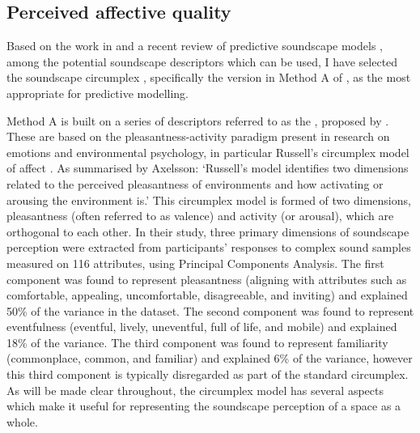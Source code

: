 
\subsection{Perceived affective quality}
\label{sec:paqReview}
Based on the work in \citet{Aletta2016Soundscape} and a recent review of predictive soundscape models \citep{Lionello2020systematic}, among the potential soundscape descriptors which can be used, I have selected the soundscape circumplex \citep{Axelsson2010principal}, specifically the version in Method A of \citet{ISO12913Part2}, as the most appropriate for predictive modelling. 

Method A is built on a series of descriptors referred to as the , proposed by \citet{Axelsson2010principal}. These  are based on the pleasantness-activity paradigm present in research on emotions and environmental psychology, in particular Russell's circumplex model of affect \citep{Russell1980circumplex}. As summarised by Axelsson: `Russell's model identifies two dimensions related to the perceived pleasantness of environments and how activating or arousing the environment is.' This circumplex model is formed of two dimensions, pleasantness (often referred to as valence) and activity (or arousal), which are orthogonal to each other. In their study, three primary dimensions of soundscape perception were extracted from participants' responses to complex sound samples measured on 116 attributes, using Principal Components Analysis. The first component was found to represent pleasantness (aligning with attributes such as comfortable, appealing, uncomfortable, disagreeable, and inviting) and explained 50\% of the variance in the dataset. The second component was found to represent eventfulness (eventful, lively, uneventful, full of life, and mobile) and explained 18\% of the variance. The third component was found to represent familiarity (commonplace, common, and familiar) and explained 6\% of the variance, however this third component is typically disregarded as part of the standard circumplex. As will be made clear throughout, the circumplex model has several aspects which make it useful for representing the soundscape perception of a space as a whole.

